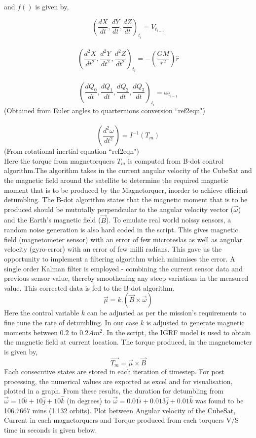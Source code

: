 \documentclass[11pt]{report}
\begin{document}
	\noindent and $f()$ is given by,
	
	$$\left(\frac{dX}{dt},\frac{dY}{dt},\frac{dZ}{dt}\right)_{t_i} = V_{t_{i-1}}$$\\
	$$\left(\frac{d^2X}{dt^2},\frac{d^2Y}{dt^2},\frac{d^2Z}{dt^2}\right)_{t_i} = -\left(\frac{GM}{r^2}\right)\hat{r}$$\\
	$$\left(\frac{dQ_0}{dt},\frac{dQ_1}{dt},\frac{dQ_2}{dt},\frac{dQ_3}{dt}\right)_{t_i} = \omega_{t_{i-1}}$$
	\hspace{35pt} (Obtained from Euler angles to quarternions conversion ``ref2eqn")\\\\
	\pagebreak
	$$\left(\frac{d^2\omega}{dt^2}\right) = I^{-1}(T_m)$$
	\hspace{100pt} (From rotational inertial equation ``ref2eqn")\\
	
	Here the torque from magnetorquers $T_m$ is computed from B-dot control algorithm.The algorithm takes in the current angular velocity of the CubeSat and the magnetic field around the satellite to determine the required magnetic moment that is to be produced by the Magnetorquer, inorder to achieve efficient detumbling. The B-dot algorithm states that the magnetic moment that is to be produced should be mututally perpendcular to the angular velocity vector ($\vec{\omega}$) and the Earth's magnetic field ($\vec{B}$). To emulate real world noissy sensors, a random noise generation is also hard coded in the script. This gives magnetic field (magnetometer sensor) with an error of few microteslas as well as angular velocity (gyro-error)  with an error of few milli radians. This gave us the opportunity to implement a filtering algorithm which minimises the error. A single order Kalman filter is employed - combining the current sensor data and previous sensor value, thereby smoothening any steep variations in the measured value. This corrected data is fed to the B-dot algorithm.
	$$\vec{\mu} = k.\left(\vec{B}\times\vec{\omega}\right)$$
	Here the control variable $k$ can be adjusted as per the mission's requirements to fine tune the rate of detumbling. In our case $k$ is adjusted to generate magnetic moments between $0.2\text{ to }0.2Am^2$. In the script, the IGRF model is used to obtain the magnetic field at current location. The torque produced, in the magnetometer is given by, 	
	$$\vec{T_m} = \vec{\mu}\times\vec{B}$$
	Each consecutive states are stored in each iteration of timestep. For post processing, the numerical values are exported as excel and for visualisation, plotted in a graph. From these results, the duration for detumbling from $\vec{\omega}=10\hat{i}+10\hat{j}+10\hat{k}$ (in degrees) to $\vec{\omega}=0.01\hat{i}+0.013\hat{j}+0.01\hat{k}$ was found to be 106.7667 mins (1.132 orbits). Plot between Angular velocity of the CubeSat, Current in each magnetorquers and Torque produced from each torquers V/S time in seconds is given below. 
	\pagebreak
	
\end{document}
